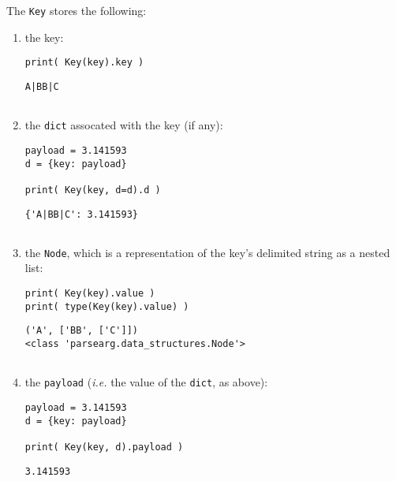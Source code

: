 \documentclass[10pt]{amsart}
\numberwithin{equation}{section}
\begin{document}
The \texttt{Key} stores the following: 
\begin{enumerate}
\item the key:
\begin{verbatim}
print( Key(key).key )
\end{verbatim}

\begin{verbatim}
A|BB|C


\end{verbatim}

\item the \texttt{dict} assocated with the key (if any):
\begin{verbatim}
payload = 3.141593
d = {key: payload}

print( Key(key, d=d).d )
\end{verbatim}

\begin{verbatim}
{'A|BB|C': 3.141593}


\end{verbatim}

\item the \texttt{Node}, which is a representation of the key's delimited string
as a nested list:
\begin{verbatim}
print( Key(key).value )
print( type(Key(key).value) )
\end{verbatim}

\begin{verbatim}
('A', ['BB', ['C']])
<class 'parsearg.data_structures.Node'>


\end{verbatim}

\item the \texttt{payload} (\emph{i.e.} the value of the \texttt{dict}, as above):
\begin{verbatim}
payload = 3.141593
d = {key: payload}

print( Key(key, d).payload )
\end{verbatim}

\begin{verbatim}
3.141593


\end{verbatim}
\end{enumerate}
\end{document}
